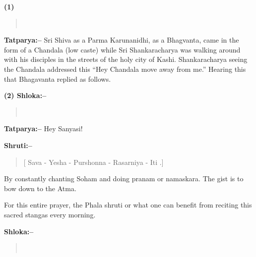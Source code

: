 

\begin{center}
\textbf{}
\end{center}

\textbf{(1) }

\begin{verse}
 \\
\end{verse}

\textbf{Tatparya:–} Sri Shiva as a Parma Karunanidhi, as a Bhagvanta, came in the form of a Chandala (low caste) while Sri Shankaracharya was walking around with his disciples in the streets of the holy city of Kashi. Shankaracharya seeing the Chandala addressed this “Hey Chandala move away from me.” Hearing this that Bhagavanta replied as follows.

\textbf{(2) Shloka:–}

\begin{verse}
 \\
\end{verse}

\textbf{Tatparya:–} Hey Sanyasi!

\textbf{Shruti:–}

\begin{verse}
[ Sava - Yesha - Purshonna - Rasarniya - Iti .]
\end{verse}

By constantly chanting Soham and doing pranam or namaskara. The gist is to bow down to the Atma.

For this entire prayer, the Phala shruti or what one can benefit from reciting this sacred stangas every morning.

\textbf{Shloka:–}

\begin{verse}
 \\
\end{verse}

